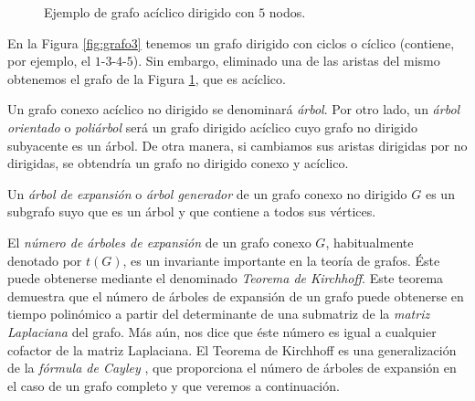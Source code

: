 \begin{figure}[H]
\centering
{}
\caption{Ejemplo de grafo acíclico dirigido con $5$ nodos.}
\label{fig:grafo8}
\end{figure}

\begin{exampleth}
En la Figura \ref{fig:grafo3} tenemos un grafo dirigido con ciclos o cíclico (contiene, por ejemplo, el $1$-$3$-$4$-$5$). Sin embargo, eliminado una de las aristas del mismo obtenemos el grafo de la Figura \ref{fig:grafo8}, que es acíclico. 
\end{exampleth}

\begin{definition}
Un grafo conexo acíclico no dirigido se denominará \emph{árbol}. Por otro lado, un \emph{árbol orientado} o \emph{poliárbol} será un grafo dirigido acíclico cuyo grafo no dirigido subyacente es un árbol. De otra manera, si cambiamos sus aristas dirigidas por no dirigidas, se obtendría un grafo no dirigido conexo y acíclico.
\end{definition}

\begin{definition}
Un \emph{árbol de expansión} o \emph{árbol generador} de un grafo conexo no dirigido $G$ es un subgrafo suyo que es un árbol y que contiene a todos sus vértices.

El \emph{número de árboles de expansión} de un grafo conexo $G$, habitualmente denotado por $t(G)$, es un invariante importante en la teoría de grafos. Éste puede obtenerse mediante el denominado \emph{Teorema de Kirchhoff}. Este teorema demuestra que el número de árboles de expansión de un grafo puede obtenerse en tiempo polinómico a partir del determinante de una submatriz de la \emph{matriz Laplaciana} del grafo. Más aún, nos dice que éste número es igual a cualquier cofactor de la matriz Laplaciana. El Teorema de Kirchhoff es una generalización de la \emph{fórmula de Cayley} \cite{EspinosaArmenta:LaFormulaDeCayley}, que proporciona el número de árboles de expansión en el caso de un grafo completo y que veremos a continuación.
\end{definition}

